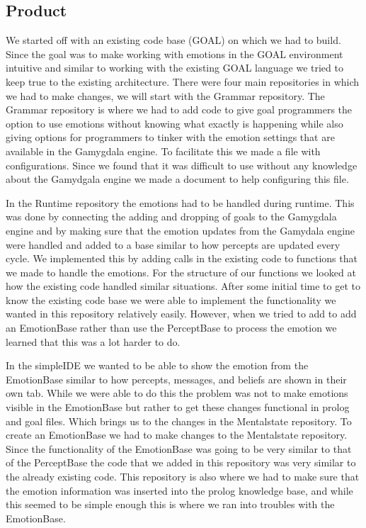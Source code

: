 \documentclass[]{article}
\begin{document}
\subsection{Product}
We started off with an existing code base (GOAL) on which we had to build. Since the goal was to make working with emotions in the GOAL environment intuitive and similar to working with the existing GOAL language we tried to keep true to the existing architecture. There were four main repositories in which we had to make changes, we will start with the Grammar repository.
The Grammar repository is where we had to add code to give goal programmers the option to use emotions without knowing what exactly is happening while also giving options for programmers to tinker with the emotion settings that are available in the Gamygdala engine. To facilitate this we made a file with configurations. Since we found that it was difficult to use without any knowledge about the Gamydgala engine we made a document to help configuring this file.\par 
In the Runtime repository the emotions had to be handled during runtime. This was done by connecting the adding and dropping of goals to the Gamygdala engine and by making sure that the emotion updates from the Gamydala engine were handled and added to a base similar to how percepts are updated every cycle. We implemented this by adding calls in the existing code to functions that we made to handle the emotions. For the structure of our functions we looked at how the existing code handled similar situations. After some initial time to get to know the existing code base we were able to implement the functionality we wanted in this repository relatively easily. However, when we tried to add to add an EmotionBase rather than use the PerceptBase to process the emotion we learned that this was a lot harder to do. \par 
In the simpleIDE we wanted to be able to show the emotion from the EmotionBase similar to how percepts, messages, and beliefs are shown in their own tab. While we were able to do this the problem was not to make emotions visible in the EmotionBase but rather to get these changes functional in prolog and goal files. Which brings us to the changes in the Mentalstate repository.
To create an EmotionBase we had to make changes to the Mentalstate repository. Since the functionality of the EmotionBase was going to be very similar to that of the PerceptBase the code that we added in this repository was very similar to the already existing code. This repository is also where we had to make sure that the emotion information was inserted into the prolog knowledge base, and while this seemed to be simple enough this is where we ran into troubles with the EmotionBase. \par 
\end{document}
